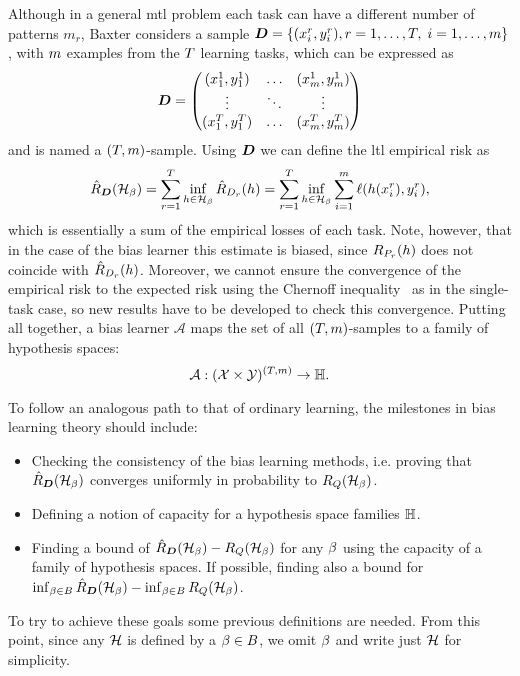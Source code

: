 Although in a general \acrshort{mtl} problem each task can have a different number of patterns $m_r$, Baxter considers a sample $\bm{D}=\{(x_i^r, y_i^r), r=1, \ldots, T, \; i=1, \ldots, m \}$, with $m$ examples from the $T$ learning tasks, which can be expressed as
\begin{equation}
    \nonumber
    \bm{D} = 
    \begin{pmatrix}
        (x_1^1, y_1^1) & \ldots & (x_m^1, y_m^1) \\
        \vdots & \ddots & \vdots \\
        (x_1^T, y_1^T) & \ldots & (x_m^T, y_m^T) \\
    \end{pmatrix}
\end{equation}
and is named a $(T, m)$-sample.
Using $\bm{D}$ we can define the \acrshort{ltl} empirical risk as
\begin{equation}\label{eq:biaslearn_emprisk}
    \bemprisk(\hypspace_\fparam) = \sum_{r=1}^\ntasks \inf_{\hypf \in \hypspace_\fparam} \hat{\risk}_{\sample_r}(\hypf) = \sum_{r=1}^\ntasks \inf_{\hypf \in \hypspace_\fparam} \sum_{i=1}^m \lossf(\hypf(x_i^r), y_i^r),
\end{equation}
which is essentially a sum of the empirical losses of each task. 
Note, however, that in the case of the bias learner this estimate is biased, since $R_{P_r}(h)$ does not coincide with $\hat{R}_{D_r}(h)$. 
%
Moreover, we cannot ensure the convergence of the empirical risk to the expected risk using the Chernoff inequality~\citep{Chernoff52} as in the single-task case, so new results have to be developed to check this convergence.
%
Putting all together, a bias learner $\mathcal{A}$ maps the set of all $(T, m)$-samples to a family of hypothesis spaces:
\begin{equation}
    \nonumber
    \mathcal{A} : {(\mathcal{X} \times \mathcal{Y})^{(T, m)}} \to \mathbb{H}.
\end{equation}
%

To follow an analogous path to that of ordinary learning, the milestones in bias learning theory should include:
\begin{itemize}
    \item Checking the consistency of the bias learning methods, i.e. proving that $\hat{R}_{\bm{D}}(\mathcal{H}_\beta)$ converges uniformly in probability to $R_Q(\mathcal{H}_\beta)$.
    \item Defining a notion of capacity for a hypothesis space families $\mathbb{H}$.
    \item Finding a bound of $\hat{R}_{\bm{D}}(\mathcal{H}_\beta) - R_Q(\mathcal{H}_\beta)$ for any $\beta$ using the capacity of a family of hypothesis spaces. If possible, finding also a bound for $\inf_{\beta \in B}\hat{R}_{\bm{D}}(\mathcal{H}_\beta) - \inf_{\beta \in B} R_Q(\mathcal{H}_\beta)$.
\end{itemize}
To try to achieve these goals some previous definitions are needed. From this point, since any $\mathcal{H}$ is defined by a $\beta \in B$, we omit $\beta$ and write just $\mathcal{H}$ for simplicity.
%


